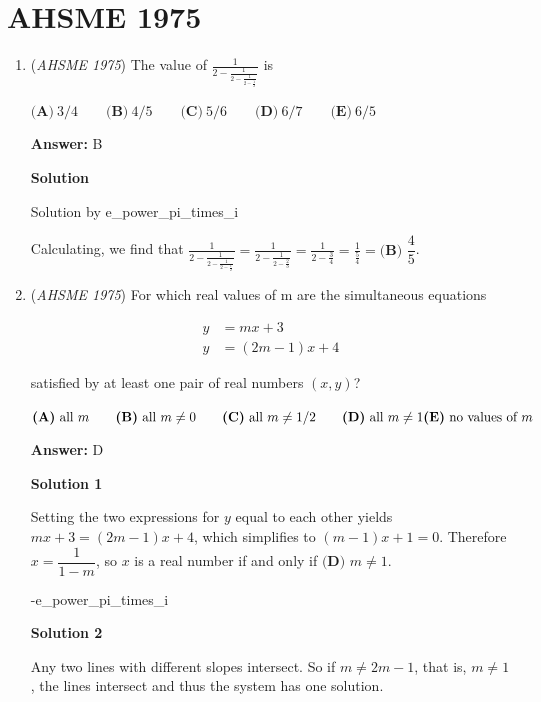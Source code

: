 \section{AHSME 1975}
        \begin{enumerate}
        	\item (\textit{AHSME 1975}) The value of $\frac {1}{2 - \frac {1}{2 - \frac {1}{2 - \frac12}}}$ is 


 $\textbf{(A)}\ 3/4 \qquad  \textbf{(B)}\ 4/5 \qquad  \textbf{(C)}\ 5/6 \qquad  \textbf{(D)}\ 6/7 \qquad  \textbf{(E)}\ 6/5$

 \textbf{Answer: }B



\textbf{Solution}

Solution by e\_power\_pi\_times\_i

 
Calculating, we find that $\frac {1}{2 - \frac {1}{2 - \frac {1}{2 - \frac12}}} = \frac {1}{2 - \frac {1}{2 - \frac {2}{3}}} = \frac {1}{2 - \frac {3}{4}} = \frac {1}{\frac {5}{4}} = \boxed{\textbf{(B) } \dfrac{4}{5}}$.

 


	\item (\textit{AHSME 1975}) For which real values of m are the simultaneous equations 

 \begin{align*}y &= mx + 3 \\  y& = (2m - 1)x + 4\end{align*}
 
satisfied by at least one pair of real numbers $(x,y)$? 


 $\textbf{(A)}\ \text{all }m\qquad \textbf{(B)}\ \text{all }m\neq 0\qquad \textbf{(C)}\ \text{all }m\neq 1/2\qquad \textbf{(D)}\ \text{all }m\neq 1\qquad \\ \textbf{(E)}\ \text{no values of }m$

 \textbf{Answer: }D



\textbf{Solution 1}

Setting the two expressions for $y$ equal to each other yields $mx+3 = (2m-1)x+4$, which simplifies to $(m-1)x+1 = 0$. Therefore $x = \dfrac{1}{1-m}$, so $x$ is a real number if and only if $\boxed{\textbf{(D) }m\neq 1}$.

 -e\_power\_pi\_times\_i

 



\textbf{Solution 2}

Any two lines with different slopes intersect.  So if $m \neq 2m - 1$, that is, $m \neq 1$, the lines intersect and thus the system has one solution.


\end{enumerate}
